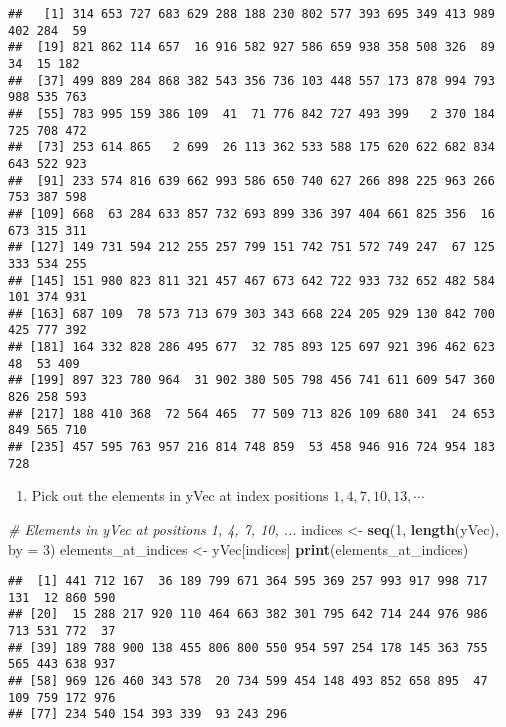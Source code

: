 \documentclass[
]{article}
\newenvironment{Shaded}{\begin{snugshade}}{\end{snugshade}}
\newcommand{\AttributeTok}[1]{\textcolor[rgb]{0.13,0.29,0.53}{#1}}
\newcommand{\CommentTok}[1]{\textcolor[rgb]{0.56,0.35,0.01}{\textit{#1}}}
\newcommand{\DecValTok}[1]{\textcolor[rgb]{0.00,0.00,0.81}{#1}}
\newcommand{\FunctionTok}[1]{\textcolor[rgb]{0.13,0.29,0.53}{\textbf{#1}}}
\newcommand{\NormalTok}[1]{#1}
\newcommand{\OtherTok}[1]{\textcolor[rgb]{0.56,0.35,0.01}{#1}}
\providecommand{\tightlist}{%
  \setlength{\itemsep}{0pt}\setlength{\parskip}{0pt}}
\begin{document}
\begin{verbatim}
##   [1] 314 653 727 683 629 288 188 230 802 577 393 695 349 413 989 402 284  59
##  [19] 821 862 114 657  16 916 582 927 586 659 938 358 508 326  89  34  15 182
##  [37] 499 889 284 868 382 543 356 736 103 448 557 173 878 994 793 988 535 763
##  [55] 783 995 159 386 109  41  71 776 842 727 493 399   2 370 184 725 708 472
##  [73] 253 614 865   2 699  26 113 362 533 588 175 620 622 682 834 643 522 923
##  [91] 233 574 816 639 662 993 586 650 740 627 266 898 225 963 266 753 387 598
## [109] 668  63 284 633 857 732 693 899 336 397 404 661 825 356  16 673 315 311
## [127] 149 731 594 212 255 257 799 151 742 751 572 749 247  67 125 333 534 255
## [145] 151 980 823 811 321 457 467 673 642 722 933 732 652 482 584 101 374 931
## [163] 687 109  78 573 713 679 303 343 668 224 205 929 130 842 700 425 777 392
## [181] 164 332 828 286 495 677  32 785 893 125 697 921 396 462 623  48  53 409
## [199] 897 323 780 964  31 902 380 505 798 456 741 611 609 547 360 826 258 593
## [217] 188 410 368  72 564 465  77 509 713 826 109 680 341  24 653 849 565 710
## [235] 457 595 763 957 216 814 748 859  53 458 946 916 724 954 183 728
\end{verbatim}

\begin{enumerate}
\def\labelenumi{(\alph{enumi})}
\setcounter{enumi}{4}
\tightlist
\item
  Pick out the elements in yVec at index positions
  \(1, 4, 7, 10, 13, \cdots\)
\end{enumerate}

\begin{Shaded}
\begin{Highlighting}[]
\CommentTok{\# Elements in yVec at positions 1, 4, 7, 10, ...}
\NormalTok{indices }\OtherTok{\textless{}{-}} \FunctionTok{seq}\NormalTok{(}\DecValTok{1}\NormalTok{, }\FunctionTok{length}\NormalTok{(yVec), }\AttributeTok{by =} \DecValTok{3}\NormalTok{)}
\NormalTok{elements\_at\_indices }\OtherTok{\textless{}{-}}\NormalTok{ yVec[indices]}
\FunctionTok{print}\NormalTok{(elements\_at\_indices)}
\end{Highlighting}
\end{Shaded}

\begin{verbatim}
##  [1] 441 712 167  36 189 799 671 364 595 369 257 993 917 998 717 131  12 860 590
## [20]  15 288 217 920 110 464 663 382 301 795 642 714 244 976 986 713 531 772  37
## [39] 189 788 900 138 455 806 800 550 954 597 254 178 145 363 755 565 443 638 937
## [58] 969 126 460 343 578  20 734 599 454 148 493 852 658 895  47 109 759 172 976
## [77] 234 540 154 393 339  93 243 296
\end{verbatim}
\end{document}
